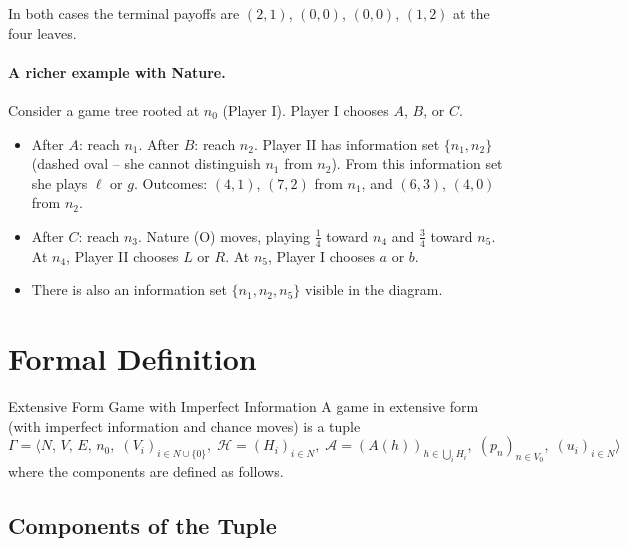 \documentclass[12pt, a4paper]{article}
\begin{document}
In both cases the terminal payoffs are $(2,1)$, $(0,0)$, $(0,0)$, $(1,2)$ at the four leaves.

\paragraph{A richer example with Nature.}
Consider a game tree rooted at $n_0$ (Player I). Player I chooses $A$, $B$, or $C$.
\begin{itemize}
  \item After $A$: reach $n_1$. After $B$: reach $n_2$. Player II has information set $\{n_1, n_2\}$ (dashed oval -- she cannot distinguish $n_1$ from $n_2$). From this information set she plays $\ell$ or $g$. Outcomes: $(4,1)$, $(7,2)$ from $n_1$, and $(6,3)$, $(4,0)$ from $n_2$.
  \item After $C$: reach $n_3$. Nature (O) moves, playing $\tfrac{1}{4}$ toward $n_4$ and $\tfrac{3}{4}$ toward $n_5$. At $n_4$, Player II chooses $L$ or $R$. At $n_5$, Player I chooses $a$ or $b$.
  \item There is also an information set $\{n_1, n_2, n_5\}$ visible in the diagram.
\end{itemize}

\section{Formal Definition}

\begin{defbox}{Extensive Form Game with Imperfect Information}
A game in extensive form (with imperfect information and chance moves) is a tuple
\[
  \Gamma = \bigl\langle N,\, V,\, E,\, n_0,\;
           (V_i)_{i \in N \cup \{0\}},\;
           \mathcal{H} = (H_i)_{i \in N},\;
           \mathcal{A} = (A(h))_{h \in \bigcup_i H_i},\;
           (p_n)_{n \in V_0},\;
           (u_i)_{i \in N}
           \bigr\rangle
\]
where the components are defined as follows.
\end{defbox}

\subsection{Components of the Tuple}
\end{document}
